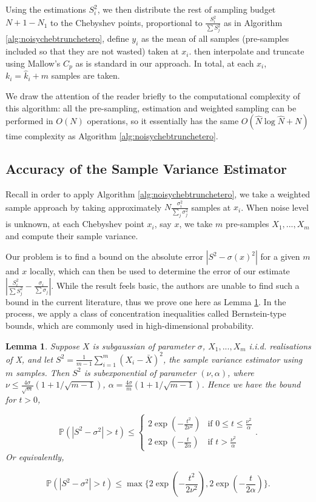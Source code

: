 \documentclass[pdflatex,sn-mathphys-num]{sn-jnl}%
\theoremstyle{thmstyleone}%
\newtheorem{lemma}[theorem]{Lemma}
\theoremstyle{thmstyletwo}%
\theoremstyle{thmstylethree}%
\begin{document}
Using the estimations $S_i^2$, we then distribute the rest of sampling budget $N+1 - N_1$ to the Chebyshev points, proportional to $\frac{S_i^2}{\sum S_j^2}$ as in Algorithm \ref{alg:noisychebtrunchetero}, define $y_i$ as the mean of all samples (pre-samples included so that they are not wasted)  taken at $x_i$. then interpolate and truncate using Mallow's $C_p$ as is standard in our approach. In total, at each $x_i$, $k_i = \hat{k}_i+ m$ samples are taken. 


We draw the attention of the reader briefly to the computational complexity of this algorithm: all the pre-sampling, estimation and weighted sampling can be performed in $O(N)$ operations, so it essentially has the same $O(
\hat{N}\log \hat{N}+N)$ time complexity as Algorithm \ref{alg:noisychebtrunchetero}.

\subsection{Accuracy of the Sample Variance Estimator} \label{sec:sample_var}

Recall in order to apply Algorithm \ref{alg:noisychebtrunchetero}, we take a weighted sample approach by taking approximately $N \frac{\sigma^2_i}{\sum_j \sigma^2_j}$ samples at $x_i$. When noise level is unknown, at each Chebyshev point $x_i$, say $x$, we take $m$ pre-samples $X_1,..., X_m$ and compute their sample variance.


Our problem is to find a bound on the absolute error $|S^2 - \sigma(x)^2|$ for a given $m$ and $x$ locally, which can then be used to determine the error of our estimate $|\frac{S^2_i}{\sum S^2_j} - \frac{\sigma_i}{\sum \sigma_j}|$. While the result feels basic, the authors are unable to find such a bound in the current literature, thus we prove one here as Lemma \ref{lem:sample_var_bound}. In the process, we apply a class of concentration inequalities called Bernstein-type bounds, which are commonly used in high-dimensional probability.

\begin{lemma}\label{lem:sample_var_bound}
	Suppose $ X$ is subgaussian of parameter $\sigma$, $X_1, ...,X_m$ i.i.d. realisations of X, and let $S^2 = \frac{1}{m-1} \sum_{i=1}^{m} (X_i-\bar{X})^2$, the sample variance estimator using $m$ samples. Then $S^2$ is subexponential of parameter $(\nu, \alpha)$, where $\nu \leq \frac{4\sigma}{\sqrt{m}}(1+1/\sqrt{m-1})$, $\alpha = \frac{4\sigma}{m}(1+1/\sqrt{m-1})$. Hence we have the bound for $t>0$, 
	
	\[\mathbb{P}(|S^2-\sigma^2| > t) \leq \begin{cases}
		2\exp(-\frac{t^2}{2\nu^2}) & \text{if } 0\leq t\leq \frac{\nu^2}{\alpha}\\
		2\exp(-\frac{t}{2\alpha}) & \text{if } t>\frac{\nu^2}{\alpha}
	\end{cases}.\]
	Or equivalently, 
	
	\[\mathbb{P}(|S^2-\sigma^2| > t) \leq \max \{		2\exp(-\frac{t^2}{2\nu^2}),
	2\exp(-\frac{t}{2\alpha})\}	.\]
\end{lemma}
\end{document}
